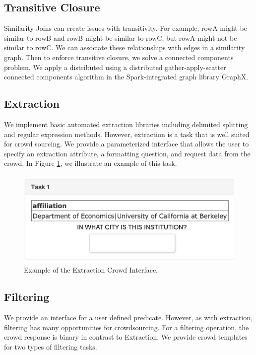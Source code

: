 \subsection{Transitive Closure}
Similarity Joins can create issues with transitivity.
For example, rowA might be similar to rowB and rowB might be similar to rowC, but rowA might not be similar to rowC.
We can associate these relationships with edges in a similarity graph.
Then to enforce transitive closure, we solve a connected components problem.
We apply a distributed using a distributed gather-apply-scatter connected components algorithm in the Spark-integrated graph library GraphX.

\subsection{Extraction}
We implement basic automated extraction libraries including delimited splitting and regular expression methods.
However, extraction is a task that is well suited for crowd sourcing.
We provide a parameterized interface that allows the user to specify an extraction attribute, a formatting question, and request data from the crowd.
In Figure \ref{fig:entry}, we illustrate an example of this task.

\begin{figure}[ht!]
\centering
\includegraphics[scale=0.25]{figs/entry.png}
\caption{Example of the Extraction Crowd Interface. \label{fig:entry}}\vspace{-.5em}
\end{figure}

\subsection{Filtering}
We provide an interface for a user defined predicate.
However, as with extraction, filtering has many opportunities for crowdsourcing.
For a filtering operation, the crowd response is binary in contrast to Extraction.
We provide crowd templates for two types of filtering tasks.

